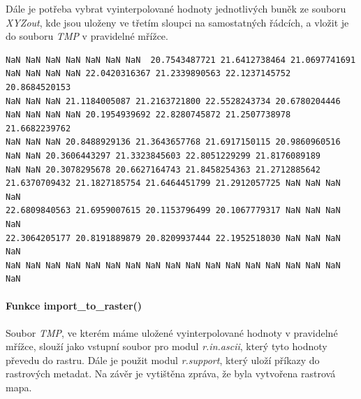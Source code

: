 \documentclass[12pt,a4paper]{article}
\begin{document}
Dále je potřeba vybrat vyinterpolované hodnoty jednotlivých buněk ze souboru \emph{XYZout}, kde jsou uloženy ve třetím sloupci na samostatných řádcích, a vložit je do souboru \emph{TMP} v pravidelné mřížce.

\lstset{basicstyle=\footnotesize}
\begin{lstlisting}
NaN NaN NaN NaN NaN NaN NaN  20.7543487721 21.6412738464 21.0697741691 
NaN NaN NaN NaN 22.0420316367 21.2339890563 22.1237145752 20.8684520153 
NaN NaN NaN 21.1184005087 21.2163721800 22.5528243734 20.6780204446 
NaN NaN NaN NaN 20.1954939692 22.8280745872 21.2507738978 21.6682239762 
NaN NaN NaN 20.8488929136 21.3643657768 21.6917150115 20.9860960516 
NaN NaN 20.3606443297 21.3323845603 22.8051229299 21.8176089189 
NaN NaN 20.3078295678 20.6627164743 21.8458254363 21.2712885642 
21.6370709432 21.1827185754 21.6464451799 21.2912057725 NaN NaN NaN NaN 
22.6809840563 21.6959007615 20.1153796499 20.1067779317 NaN NaN NaN NaN 
22.3064205177 20.8191889879 20.8209937444 22.1952518030 NaN NaN NaN NaN 
NaN NaN NaN NaN NaN NaN NaN NaN NaN NaN NaN NaN NaN NaN NaN NaN NaN NaN 

\end{lstlisting}

\newpage
\paragraph{Funkce import\_to\_raster()}
Soubor \emph{TMP}, ve kterém máme uložené vyinterpolované hodnoty v pravidelné mřížce, slouží jako vstupní soubor pro modul \emph{r.in.ascii}, který tyto hodnoty převedu do rastru. Dále je použit modul \emph{r.support}, který uloží příkazy do rastrových metadat. Na závěr je vytištěna zpráva, že byla vytvořena rastrová mapa.
\end{document}
